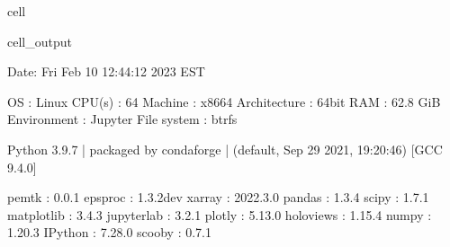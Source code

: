 \documentclass[letterpaper,table,10pt,english]{jupyterBook}
\begin{document}
\begin{sphinxuseclass}{cell}
\begin{sphinxVerbatimOutput}
\begin{sphinxuseclass}{cell_output}
\begin{sphinxVerbatim}[commandchars=\\\{\}]
\PYGZhy{}\PYGZhy{}\PYGZhy{}\PYGZhy{}\PYGZhy{}\PYGZhy{}\PYGZhy{}\PYGZhy{}\PYGZhy{}\PYGZhy{}\PYGZhy{}\PYGZhy{}\PYGZhy{}\PYGZhy{}\PYGZhy{}\PYGZhy{}\PYGZhy{}\PYGZhy{}\PYGZhy{}\PYGZhy{}\PYGZhy{}\PYGZhy{}\PYGZhy{}\PYGZhy{}\PYGZhy{}\PYGZhy{}\PYGZhy{}\PYGZhy{}\PYGZhy{}\PYGZhy{}\PYGZhy{}\PYGZhy{}\PYGZhy{}\PYGZhy{}\PYGZhy{}\PYGZhy{}\PYGZhy{}\PYGZhy{}\PYGZhy{}\PYGZhy{}\PYGZhy{}\PYGZhy{}\PYGZhy{}\PYGZhy{}\PYGZhy{}\PYGZhy{}\PYGZhy{}\PYGZhy{}\PYGZhy{}\PYGZhy{}\PYGZhy{}\PYGZhy{}\PYGZhy{}\PYGZhy{}\PYGZhy{}\PYGZhy{}\PYGZhy{}\PYGZhy{}\PYGZhy{}\PYGZhy{}\PYGZhy{}\PYGZhy{}\PYGZhy{}\PYGZhy{}\PYGZhy{}\PYGZhy{}\PYGZhy{}\PYGZhy{}\PYGZhy{}\PYGZhy{}\PYGZhy{}\PYGZhy{}\PYGZhy{}\PYGZhy{}\PYGZhy{}\PYGZhy{}\PYGZhy{}\PYGZhy{}\PYGZhy{}\PYGZhy{}
  Date: Fri Feb 10 12:44:12 2023 EST

                OS : Linux
            CPU(s) : 64
           Machine : x86\PYGZus{}64
      Architecture : 64bit
               RAM : 62.8 GiB
       Environment : Jupyter
       File system : btrfs

  Python 3.9.7 | packaged by conda\PYGZhy{}forge | (default, Sep 29 2021, 19:20:46)
  [GCC 9.4.0]

             pemtk : 0.0.1
           epsproc : 1.3.2\PYGZhy{}dev
            xarray : 2022.3.0
            pandas : 1.3.4
             scipy : 1.7.1
        matplotlib : 3.4.3
        jupyterlab : 3.2.1
            plotly : 5.13.0
         holoviews : 1.15.4
             numpy : 1.20.3
           IPython : 7.28.0
            scooby : 0.7.1
\PYGZhy{}\PYGZhy{}\PYGZhy{}\PYGZhy{}\PYGZhy{}\PYGZhy{}\PYGZhy{}\PYGZhy{}\PYGZhy{}\PYGZhy{}\PYGZhy{}\PYGZhy{}\PYGZhy{}\PYGZhy{}\PYGZhy{}\PYGZhy{}\PYGZhy{}\PYGZhy{}\PYGZhy{}\PYGZhy{}\PYGZhy{}\PYGZhy{}\PYGZhy{}\PYGZhy{}\PYGZhy{}\PYGZhy{}\PYGZhy{}\PYGZhy{}\PYGZhy{}\PYGZhy{}\PYGZhy{}\PYGZhy{}\PYGZhy{}\PYGZhy{}\PYGZhy{}\PYGZhy{}\PYGZhy{}\PYGZhy{}\PYGZhy{}\PYGZhy{}\PYGZhy{}\PYGZhy{}\PYGZhy{}\PYGZhy{}\PYGZhy{}\PYGZhy{}\PYGZhy{}\PYGZhy{}\PYGZhy{}\PYGZhy{}\PYGZhy{}\PYGZhy{}\PYGZhy{}\PYGZhy{}\PYGZhy{}\PYGZhy{}\PYGZhy{}\PYGZhy{}\PYGZhy{}\PYGZhy{}\PYGZhy{}\PYGZhy{}\PYGZhy{}\PYGZhy{}\PYGZhy{}\PYGZhy{}\PYGZhy{}\PYGZhy{}\PYGZhy{}\PYGZhy{}\PYGZhy{}\PYGZhy{}\PYGZhy{}\PYGZhy{}\PYGZhy{}\PYGZhy{}\PYGZhy{}\PYGZhy{}\PYGZhy{}\PYGZhy{}
\end{sphinxVerbatim}

\end{sphinxuseclass}\end{sphinxVerbatimOutput}

\end{sphinxuseclass}
\end{document}
